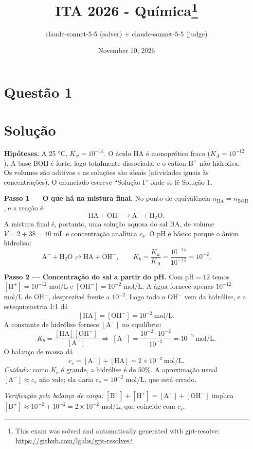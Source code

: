 \documentclass{article}%
\title{ITA 2026 - Química\thanks{This exam was solved and automatically generated with gpt-resolve: \url{https://github.com/lgabs/gpt-resolve}}}%
\author{claude{-}sonnet{-}5{-}5 (solver) + claude{-}sonnet{-}5{-}5 (judge)}%
\date{November 10, 2026}%
\begin{document}
%
\normalsize%
\maketitle%
\section*{Questão 1}

\section*{Solução}

\textbf{Hipóteses.} A 25 °C, $K_w=10^{-14}$. O ácido HA é monoprótico fraco ($K_A=10^{-12}$). A base BOH é forte, logo totalmente dissociada, e o cátion $\mathrm{B^+}$ não hidrolisa. Os volumes são aditivos e as soluções são ideais (atividades iguais às concentrações). O enunciado escreve ``Solução I'' onde se lê Solução 1.

\medskip
\textbf{Passo 1 --- O que há na mistura final.} No ponto de equivalência $n_{\mathrm{HA}}=n_{\mathrm{BOH}}$, e a reação é
\[
\mathrm{HA}+\mathrm{OH^-}\longrightarrow \mathrm{A^-}+\mathrm{H_2O}.
\]
A mistura final é, portanto, uma solução aquosa do sal BA, de volume $V=2+38=40$ mL e concentração analítica $c_s$. O pH é básico porque o ânion hidrolisa:
\[
\mathrm{A^-}+\mathrm{H_2O}\rightleftharpoons \mathrm{HA}+\mathrm{OH^-},\qquad
K_b=\frac{K_w}{K_A}=\frac{10^{-14}}{10^{-12}}=10^{-2}.
\]

\textbf{Passo 2 --- Concentração do sal a partir do pH.} Com $\mathrm{pH}=12$ temos $[\mathrm{H^+}]=10^{-12}$ mol/L e $[\mathrm{OH^-}]=10^{-2}$ mol/L. A água fornece apenas $10^{-12}$ mol/L de $\mathrm{OH^-}$, desprezível frente a $10^{-2}$. Logo todo o $\mathrm{OH^-}$ vem da hidrólise, e a estequiometria 1:1 dá
\[
[\mathrm{HA}]=[\mathrm{OH^-}]=10^{-2}\ \text{mol/L}.
\]
A constante de hidrólise fornece $[\mathrm{A^-}]$ no equilíbrio:
\[
K_b=\frac{[\mathrm{HA}][\mathrm{OH^-}]}{[\mathrm{A^-}]}
\;\Rightarrow\;
[\mathrm{A^-}]=\frac{10^{-2}\cdot10^{-2}}{10^{-2}}=10^{-2}\ \text{mol/L}.
\]
O balanço de massa dá
\[
c_s=[\mathrm{A^-}]+[\mathrm{HA}]=2\times10^{-2}\ \text{mol/L}.
\]
\emph{Cuidado:} como $K_b$ é grande, a hidrólise é de 50\%. A aproximação usual $[\mathrm{A^-}]\approx c_s$ não vale; ela daria $c_s=10^{-2}$ mol/L, que está errado.

\emph{Verificação pelo balanço de carga:} $[\mathrm{B^+}]+[\mathrm{H^+}]=[\mathrm{A^-}]+[\mathrm{OH^-}]$ implica $[\mathrm{B^+}]\approx 10^{-2}+10^{-2}=2\times10^{-2}$ mol/L, que coincide com $c_s$.
\end{document}
